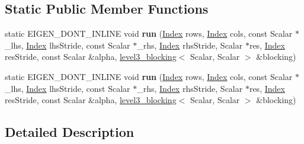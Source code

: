 \subsection*{Static Public Member Functions}
\begin{DoxyCompactItemize}
\item 
\mbox{\label{struct_eigen_1_1internal_1_1product__selfadjoint__matrix_3_01_scalar_00_01_index_00_01_lhs_storaad3bcb15c8c51e53cb4ff654ee80e230_a2a8c8f83ea879c56c882d30d3414cd40}} 
static E\+I\+G\+E\+N\+\_\+\+D\+O\+N\+T\+\_\+\+I\+N\+L\+I\+NE void {\bfseries run} (\hyperlink{namespace_eigen_a62e77e0933482dafde8fe197d9a2cfde}{Index} rows, \hyperlink{namespace_eigen_a62e77e0933482dafde8fe197d9a2cfde}{Index} cols, const Scalar $\ast$\+\_\+lhs, \hyperlink{namespace_eigen_a62e77e0933482dafde8fe197d9a2cfde}{Index} lhs\+Stride, const Scalar $\ast$\+\_\+rhs, \hyperlink{namespace_eigen_a62e77e0933482dafde8fe197d9a2cfde}{Index} rhs\+Stride, Scalar $\ast$res, \hyperlink{namespace_eigen_a62e77e0933482dafde8fe197d9a2cfde}{Index} res\+Stride, const Scalar \&alpha, \hyperlink{class_eigen_1_1internal_1_1level3__blocking}{level3\+\_\+blocking}$<$ Scalar, Scalar $>$ \&blocking)
\item 
\mbox{\label{struct_eigen_1_1internal_1_1product__selfadjoint__matrix_3_01_scalar_00_01_index_00_01_lhs_storaad3bcb15c8c51e53cb4ff654ee80e230_a7f04bd98fdcf2e6cb6d2129445e0fb51}} 
static E\+I\+G\+E\+N\+\_\+\+D\+O\+N\+T\+\_\+\+I\+N\+L\+I\+NE void {\bfseries run} (\hyperlink{namespace_eigen_a62e77e0933482dafde8fe197d9a2cfde}{Index} rows, \hyperlink{namespace_eigen_a62e77e0933482dafde8fe197d9a2cfde}{Index} cols, const Scalar $\ast$\+\_\+lhs, \hyperlink{namespace_eigen_a62e77e0933482dafde8fe197d9a2cfde}{Index} lhs\+Stride, const Scalar $\ast$\+\_\+rhs, \hyperlink{namespace_eigen_a62e77e0933482dafde8fe197d9a2cfde}{Index} rhs\+Stride, Scalar $\ast$res, \hyperlink{namespace_eigen_a62e77e0933482dafde8fe197d9a2cfde}{Index} res\+Stride, const Scalar \&alpha, \hyperlink{class_eigen_1_1internal_1_1level3__blocking}{level3\+\_\+blocking}$<$ Scalar, Scalar $>$ \&blocking)
\end{DoxyCompactItemize}


\subsection{Detailed Description}

